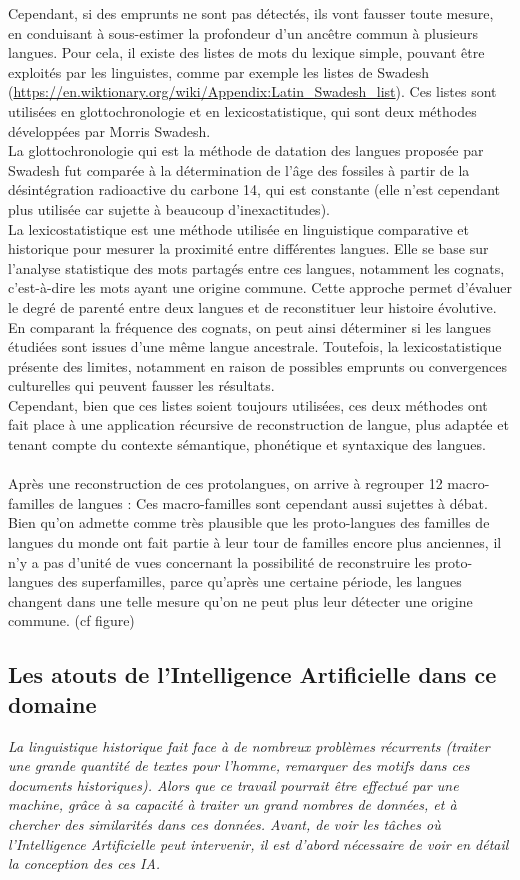 \documentclass[12pt, french, twoside]{report}
\begin{document}
Cependant, si des emprunts ne sont pas détectés, ils vont fausser toute mesure, en conduisant à sous-estimer la profondeur d'un ancêtre commun à plusieurs langues. Pour cela, il existe des listes de mots du lexique simple, pouvant être exploités par les linguistes, comme par exemple les listes de Swadesh (\url{https://en.wiktionary.org/wiki/Appendix:Latin_Swadesh_list}). Ces listes sont utilisées en glottochronologie et en lexicostatistique, qui sont deux méthodes développées par Morris Swadesh.\\

La glottochronologie qui est la méthode de datation des langues proposée par Swadesh fut comparée à la détermination de l'âge des fossiles à partir de la désintégration radioactive du carbone 14, qui est constante (elle n'est cependant plus utilisée car sujette à beaucoup d'inexactitudes). \\
\indent La lexicostatistique est une méthode utilisée en linguistique comparative et historique pour mesurer la proximité entre différentes langues. Elle se base sur l'analyse statistique des mots partagés entre ces langues, notamment les cognats, c'est-à-dire les mots ayant une origine commune. Cette approche permet d'évaluer le degré de parenté entre deux langues et de reconstituer leur histoire évolutive. En comparant la fréquence des cognats, on peut ainsi déterminer si les langues étudiées sont issues d'une même langue ancestrale. Toutefois, la lexicostatistique présente des limites, notamment en raison de possibles emprunts ou convergences culturelles qui peuvent fausser les résultats.
\\ \indent Cependant, bien que ces listes soient toujours utilisées,  ces deux méthodes ont fait place à une application récursive de reconstruction de langue, plus adaptée et tenant compte du contexte sémantique, phonétique et syntaxique des langues.
\\ \\ 
\indent Après une reconstruction de ces protolangues, on arrive à regrouper 12 macro-familles de langues :  
Ces macro-familles sont cependant aussi sujettes à débat. Bien qu'on admette comme très plausible que les proto-langues des familles de langues du monde ont fait partie à leur tour de familles encore plus anciennes, il n'y a pas d'unité de vues concernant la possibilité de reconstruire les proto-langues des superfamilles, parce qu'après une certaine période, les langues changent dans une telle mesure qu'on ne peut plus leur détecter une origine commune. (cf figure) 
\subsection{Les atouts de l'Intelligence Artificielle dans ce domaine}
\textit{La linguistique historique fait face à de nombreux problèmes récurrents (traiter une grande quantité de textes pour l'homme, remarquer des motifs dans ces documents historiques). Alors que ce travail pourrait être effectué par une machine, grâce à sa capacité à traiter un grand nombres de données, et à chercher des similarités dans ces données. Avant, de voir les tâches où l'Intelligence Artificielle peut intervenir, il est d'abord nécessaire de voir en détail la conception des ces IA.}
\end{document}
